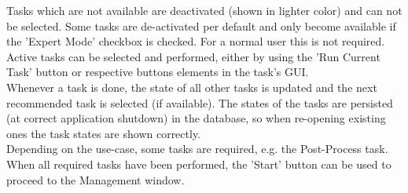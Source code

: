 Tasks which are not available are deactivated (shown in lighter color) and can not be selected. Some tasks are de-activated per default and only become available if the 'Expert Mode' checkbox is checked. For a normal user this is not required.\\

Active tasks can be selected and performed, either by using the 'Run Current Task' button or respective buttons elements in the task's GUI. \\

Whenever a task is done, the state of all other tasks is updated and the next recommended task is selected (if available). The states of the tasks are persisted (at correct application shutdown) in the database, so when re-opening existing ones the task states are shown correctly. \\

Depending on the use-case, some tasks are required, e.g. the Post-Process task. When all required tasks have been performed, the 'Start' button can be used to proceed to the Management window.





















